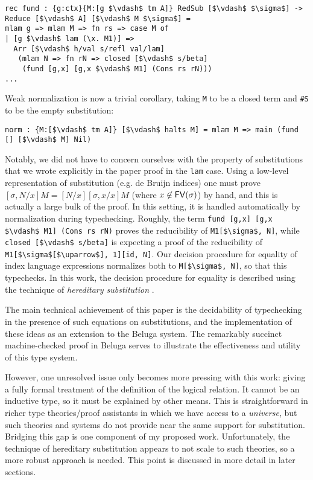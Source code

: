 \documentclass{article}
\begin{document}
\begin{lstlisting}
rec fund : {g:ctx}{M:[g $\vdash$ tm A]} RedSub [$\vdash$ $\sigma$] -> Reduce [$\vdash$ A] [$\vdash$ M $\sigma$] =
mlam g => mlam M => fn rs => case M of
| [g $\vdash$ lam (\x. M1)] =>
  Arr [$\vdash$ h/val s/refl val/lam]
   (mlam N => fn rN => closed [$\vdash$ s/beta]
    (fund [g,x] [g,x $\vdash$ M1] (Cons rs rN)))
...
\end{lstlisting}

Weak normalization is now a trivial corollary, taking \lstinline{M} to be a closed term and
\lstinline{#S} to be the empty substitution:

\begin{lstlisting}
norm : {M:[$\vdash$ tm A]} [$\vdash$ halts M] = mlam M => main (fund [] [$\vdash$ M] Nil)
\end{lstlisting}

Notably, we did not have to concern
ourselves with the property of substitutions that we wrote explicitly
in the paper proof in the \lstinline{lam} case. Using a low-level representation
of substitution (e.g. de Bruijn indices) one must prove $[\sigma,N/x]M = [N/x][\sigma,x/x]M$
(where $x \not\in \mathsf{FV}(\sigma)$) by hand, and this is actually a large
bulk of the proof. In this setting, it is handled automatically
by normalization during typechecking. Roughly, the
term \lstinline{fund [g,x] [g,x $\vdash$ M1] (Cons rs rN)} proves
the reducibility of \lstinline{M1[$\sigma$, N]}, while
\lstinline{closed [$\vdash$ s/beta]} is expecting a proof of the reducibility
of
\lstinline{M1[$\sigma$[$\uparrow$], 1][id, N]}. Our decision procedure for
equality of index language expressions normalizes both to
\lstinline{M[$\sigma$, N]}, so that this typechecks. In this work, the
decision procedure for equality is described using the technique of
\emph{hereditary substitution} \citep{Watkins02tr}. 


The main technical achievement of this paper is the decidability of
typechecking in the presence of such equations on substitutions, and
the implementation of these ideas as an extension to the Beluga system. The
remarkably succinct machine-checked proof in Beluga serves to
illustrate the effectiveness and utility of this type system. 

However, one unresolved issue only becomes more pressing with this work: giving a
fully formal treatment of the definition of the logical 
relation. It cannot be an inductive type, so it must be explained by
other means. This is straightforward in richer type theories/proof
assistants in which we have access to a \emph{universe}, but such
theories and systems do not provide near the same support for
substitution. Bridging this gap is one component of my proposed
work. Unfortunately, the technique of hereditary substitution appears
to not scale to such theories, so a more robust approach is
needed. This point is discussed in more detail in later sections.
\end{document}
